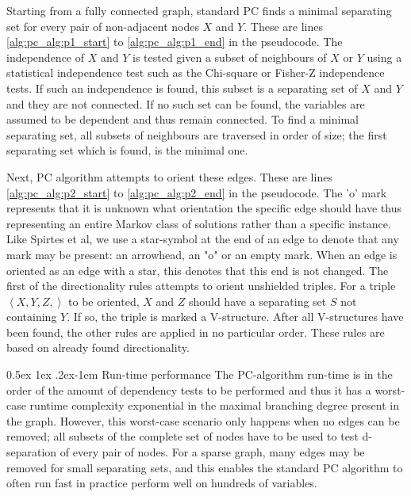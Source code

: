 \documentclass[a4paper, 10pt, english, onecolumn]{article}
\makeatletter
\renewcommand{\paragraph}{%
  \@startsection{paragraph}{4}%
  {\z@}{0.5ex \@plus 1ex \@minus .2ex}{-1em}%
  {\normalfont\normalsize\bfseries}%
}
\makeatother
\begin{document}

Starting from a fully connected graph, standard PC finds a minimal separating set for every pair of non-adjacent nodes $X$ and $Y$.
These are lines \ref{alg:pc_alg:p1_start} to \ref{alg:pc_alg:p1_end} in the pseudocode.
The independence of $X$ and $Y$ is tested given a subset of neighbours of $X$ or $Y$ using a statistical independence test such as the Chi-square or Fisher-Z independence tests. %
If such an independence is found, this subset is a separating set of $X$ and $Y$ and they are not connected.
If no such set can be found, the variables are assumed to be dependent and thus remain connected.
To find a minimal separating set, all subsets of neighbours are traversed in order of size; the first separating set which is found, is the minimal one.

Next, PC algorithm attempts to orient these edges.
These are lines \ref{alg:pc_alg:p2_start} to \ref{alg:pc_alg:p2_end} in the pseudocode.
The 'o' mark represents that it is unknown what orientation the specific edge should have thus representing an entire Markov class of solutions rather than a specific instance.
Like Spirtes et al, we use a star-symbol at the end of an edge to denote that any mark may be present: an arrowhead, an "o" or an empty mark.
When an edge is oriented as an edge with a star, this denotes that this end is not changed.
The first of the directionality rules attempts to orient unshielded triples.
For a triple $\left < X,Y,Z, \right>$ to be oriented, $X$ and $Z$ should have a separating set $S$ not containing $Y$.
If so, the triple is marked a V-structure.
After all V-structures have been found, the other rules are applied in no particular order.
These rules are based on already found directionality.

\paragraph{Run-time performance}
The PC-algorithm run-time is in the order of the amount of dependency tests to be performed and thus it has a worst-case runtime complexity exponential in the maximal branching degree present in the graph.
However, this worst-case scenario only happens when no edges can be removed; all subsets of the complete set of nodes have to be used to test d-separation of every pair of nodes.
For a sparse graph, many edges may be removed for small separating sets, and this enables the standard PC algorithm to often run fast in practice perform well on hundreds of variables. %
\end{document}
